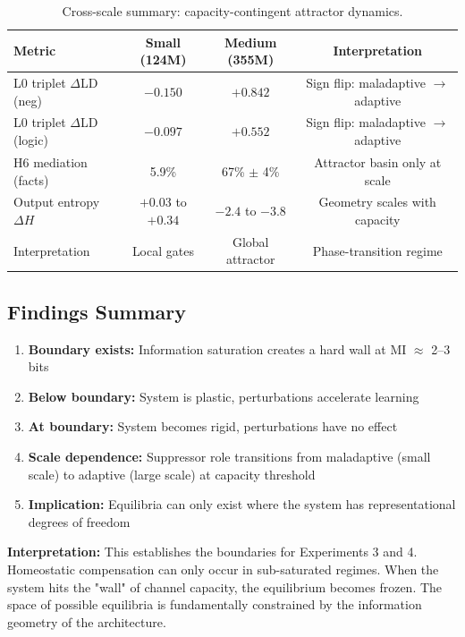 \begin{table}[h]
\centering
\caption{Cross-scale summary: capacity-contingent attractor dynamics.}
\label{tab:capacity-boundaries}
\begin{tabular}{lccc}
\toprule
Metric & Small (124M) & Medium (355M) & Interpretation \\
\midrule
L0 triplet $\Delta$LD (neg) & $-0.150$ & $+0.842$ & Sign flip: maladaptive $\to$ adaptive \\
L0 triplet $\Delta$LD (logic) & $-0.097$ & $+0.552$ & Sign flip: maladaptive $\to$ adaptive \\
H6 mediation (facts) & 5.9\% & 67\% $\pm$ 4\% & Attractor basin only at scale \\
Output entropy $\Delta H$ & $+0.03$ to $+0.34$ & $-2.4$ to $-3.8$ & Geometry scales with capacity \\
Interpretation & Local gates & Global attractor & Phase-transition regime \\
\bottomrule
\end{tabular}
\end{table}

\subsection{Findings Summary}

\begin{enumerate}
\item \textbf{Boundary exists:} Information saturation creates a hard wall at MI $\approx$ 2--3 bits
\item \textbf{Below boundary:} System is plastic, perturbations accelerate learning
\item \textbf{At boundary:} System becomes rigid, perturbations have no effect
\item \textbf{Scale dependence:} Suppressor role transitions from maladaptive (small scale) to adaptive (large scale) at capacity threshold
\item \textbf{Implication:} Equilibria can only exist where the system has representational degrees of freedom
\end{enumerate}

\textbf{Interpretation:} This establishes the boundaries for Experiments 3 and 4. Homeostatic compensation can only occur in sub-saturated regimes. When the system hits the "wall" of channel capacity, the equilibrium becomes frozen. The space of possible equilibria is fundamentally constrained by the information geometry of the architecture.
